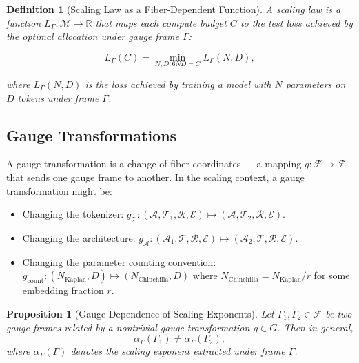 \documentclass[12pt,a4paper]{article}
\newtheorem{proposition}[theorem]{Proposition}
\newtheorem{definition}[theorem]{Definition}
\theoremstyle{remark}
\newcommand{\R}{\mathbb{R}}
\newcommand{\arch}{\mathcal{A}}
\newcommand{\tok}{\mathcal{T}}
\newcommand{\recipe}{\mathcal{R}}
\newcommand{\Loss}{L}
\begin{document}
\begin{definition}[Scaling Law as a Fiber-Dependent Function]
\label{def:scaling_fn}
A scaling law is a function $\Loss_\Gamma: \mathcal{M} \to \R$ that maps each compute budget $C$ to the test loss achieved by the optimal allocation under gauge frame $\Gamma$:

\begin{equation}
\Loss_\Gamma(C) = \min_{N,D: 6ND = C} \Loss_\Gamma(N, D),
\end{equation}

where $\Loss_\Gamma(N, D)$ is the loss achieved by training a model with $N$ parameters on $D$ tokens under frame $\Gamma$.
\end{definition}

\subsection{Gauge Transformations}

A gauge transformation is a change of fiber coordinates — a mapping $g: \mathcal{F} \to \mathcal{F}$ that sends one gauge frame to another. In the scaling context, a gauge transformation might be:

\begin{itemize}
    \item Changing the tokenizer: $g_{\tok}: (\arch, \tok_1, \recipe, \mathcal{E}) \mapsto (\arch, \tok_2, \recipe, \mathcal{E})$.
    \item Changing the architecture: $g_{\arch}: (\arch_1, \tok, \recipe, \mathcal{E}) \mapsto (\arch_2, \tok, \recipe, \mathcal{E})$.
    \item Changing the parameter counting convention: $g_{\text{count}}: (N_{\text{Kaplan}}, D) \mapsto (N_{\text{Chinchilla}}, D)$ where $N_{\text{Chinchilla}} = N_{\text{Kaplan}} / r$ for some embedding fraction $r$.
\end{itemize}

\begin{proposition}[Gauge Dependence of Scaling Exponents]
\label{prop:gauge_dep}
Let $\Gamma_1, \Gamma_2 \in \mathcal{F}$ be two gauge frames related by a nontrivial gauge transformation $g \in G$. Then in general,
\begin{equation}
\alpha_\Gamma(\Gamma_1) \neq \alpha_\Gamma(\Gamma_2),
\end{equation}
where $\alpha_\Gamma(\Gamma)$ denotes the scaling exponent extracted under frame $\Gamma$.
\end{proposition}
\end{document}
